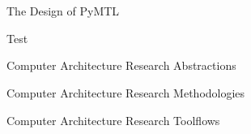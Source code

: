 
\section[{\it Presentation} PyMTL Intro]{}

\begin{frame}{The Design of PyMTL}
\end{frame}

\begin{frame}{Test}
\end{frame}

\begin{frame}{Computer Architecture Research Abstractions}
\end{frame}

\begin{frame}{Computer Architecture Research Methodologies}
\end{frame}

\begin{frame}{Computer Architecture Research Toolflows}
\end{frame}
